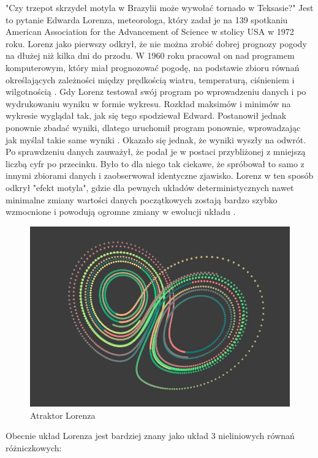 \documentclass[a4paper,12pt,reqno]{article}
\begin{document}
"Czy trzepot skrzydeł motyla w Brazylii może wywołać tornado w Teksasie?" Jest to pytanie Edwarda Lorenza, meteorologa, który zadał je na 139 spotkaniu American Association for the Advancement of Science w stolicy USA w 1972 roku\cite{lorenz_praca}.
Lorenz jako pierwszy odkrył, że nie można zrobić dobrej prognozy pogody na dłużej niż kilka dni do przodu. W 1960 roku pracował on nad programem komputerowym, który miał prognozować pogodę, na podstawie zbioru równań określających zależności między prędkością wiatru, temperaturą, ciśnieniem i wilgotnością \cite{burze_motyle}. Gdy Lorenz testował swój program po wprowadzeniu danych i po wydrukowaniu wyniku w formie wykresu. Rozkład maksimów i minimów na wykresie wyglądał tak, jak się tego spodziewał Edward. Postanowił jednak ponownie zbadać wyniki, dlatego uruchomił program ponownie, wprowadzając jak myślał takie same wyniki \cite{burze_motyle}. Okazało się jednak, że wyniki wyszły na odwrót. Po sprawdzeniu danych zauważył, że podał je w postaci przybliżonej z mniejszą liczbą cyfr po przecinku. Było to dla niego tak ciekawe, że spróbował to samo z innymi zbiorami danych i zaobserwował identyczne zjawisko. Lorenz w ten sposób odkrył "efekt motyla", gdzie dla pewnych układów deterministycznych nawet minimalne zmiany wartości danych początkowych zostają bardzo szybko wzmocnione i powodują ogromne zmiany w ewolucji układu \cite{burze_motyle}.

\begin{figure}[H]%
\centering
\includegraphics[width=0.7\columnwidth]{graphics/butterfly/Lorenz_Attractor.jpg}
\caption{Atraktor Lorenza 
\label{BPExample}}%
%
\qquad
\end{figure} 

Obecnie układ Lorenza jest bardziej znany jako układ 3 nieliniowych
równań różniczkowych\cite{lorenz_dziwne_atraktory}:
\end{document}
